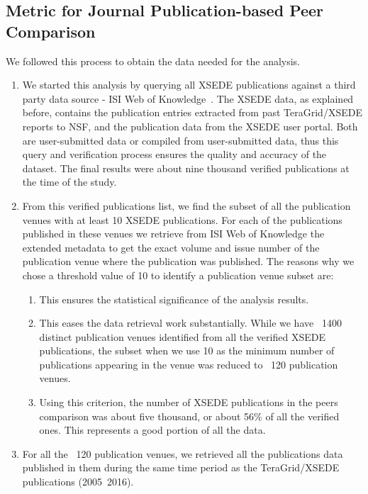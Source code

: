 \documentclass{sig-alternate}
\begin{document}
\subsection{Metric for Journal Publication-based Peer Comparison} \label{S:metric}

We followed this process to obtain the data needed for the analysis.

\begin{enumerate}
\item We started this analysis by querying all XSEDE publications
  against a third party data source - ISI Web of
  Knowledge~\cite{www-isiwos}. The XSEDE data, as explained before,
  contains the publication entries extracted from past TeraGrid/XSEDE
  reports to NSF, and the publication data from the XSEDE user
  portal. Both are user-submitted data or compiled from user-submitted
  data, thus this query and verification process ensures the quality
  and accuracy of the dataset.  The final results were about nine
  thousand verified publications at the time of the study.

\item From this verified publications list, we find the subset of all
  the publication venues with at least 10 XSEDE publications. For each
  of the publications published in these venues we retrieve from ISI
  Web of Knowledge the extended metadata to get the exact volume and
  issue number of the publication venue where the publication was
  published. The reasons why we chose a threshold value of 10 to
  identify a publication venue subset are:
\begin{enumerate}
\item This ensures the statistical significance of the analysis
  results.
\item This eases the data retrieval work substantially. While we have
  ~1400 distinct publication venues identified from all the verified
  XSEDE publications, the subset when we use 10 as the minimum number
  of publications appearing in the venue was reduced to ~120
  publication venues.
\item Using this criterion, the number of XSEDE publications in the
  peers comparison was about five thousand, or about 56\% of all the
  verified ones. This represents a good portion of all the data.
\end{enumerate}

\item For all the ~120 publication venues, we retrieved all the
  publications data published in them during the same time period as
  the TeraGrid/XSEDE publications (2005~2016).
\end{enumerate}
\end{document}
